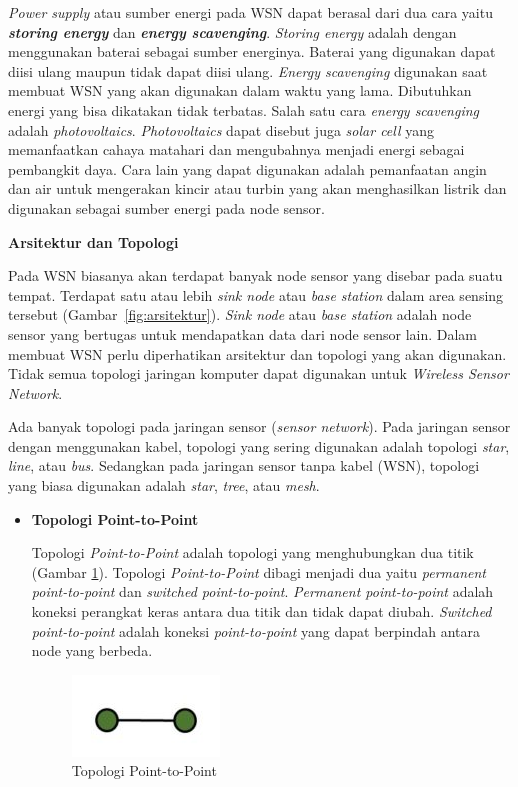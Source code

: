 \documentclass[a4paper,twoside]{article}
\begin{document}
\begin{enumerate}
\begin{itemize}
\textit{Power supply} atau sumber energi pada WSN dapat berasal dari dua cara yaitu \textbf{\textit{storing energy}} dan \textbf{\textit{energy scavenging}}. \textit{Storing energy} adalah dengan menggunakan baterai sebagai sumber energinya. Baterai yang digunakan dapat diisi ulang maupun tidak dapat diisi ulang. \textit{Energy scavenging} digunakan saat membuat WSN yang akan digunakan dalam waktu yang lama. Dibutuhkan energi yang bisa dikatakan tidak terbatas. Salah satu cara \textit{energy scavenging} adalah \textit{photovoltaics}. \textit{Photovoltaics} dapat disebut juga \textit{solar cell} yang memanfaatkan cahaya matahari dan mengubahnya menjadi energi sebagai pembangkit daya. Cara lain yang dapat digunakan adalah pemanfaatan angin dan air untuk mengerakan kincir atau turbin yang akan menghasilkan listrik dan digunakan sebagai sumber energi pada node sensor.
\end{itemize}
		
\textbf{Arsitektur dan Topologi}
		
		Pada WSN biasanya akan terdapat banyak node sensor yang disebar pada suatu tempat. Terdapat satu atau lebih \textit{sink node} atau \textit{base station} dalam area sensing tersebut (Gambar~\ref{fig:arsitektur}). \textit{Sink node} atau \textit{base station} adalah node sensor yang bertugas untuk mendapatkan data dari node sensor lain. Dalam membuat WSN perlu diperhatikan arsitektur dan topologi yang akan digunakan. Tidak semua topologi jaringan komputer dapat digunakan untuk \textit{Wireless Sensor Network}. 

Ada banyak topologi pada jaringan sensor (\textit{sensor network}). Pada jaringan sensor dengan menggunakan kabel, topologi yang sering digunakan adalah topologi \textit{star}, \textit{line}, atau \textit{bus}. Sedangkan pada jaringan sensor tanpa kabel (WSN), topologi yang biasa digunakan adalah \textit{star}, \textit{tree}, atau \textit{mesh}. 

\begin{itemize}
\item \textbf{Topologi Point-to-Point}

Topologi \textit{Point-to-Point} adalah topologi yang menghubungkan dua titik (Gambar \ref{fig:point2point}). Topologi \textit{Point-to-Point} dibagi menjadi dua yaitu \textit{permanent point-to-point} dan \textit{switched point-to-point}. \textit{Permanent point-to-point} adalah koneksi perangkat keras antara dua titik dan tidak dapat diubah. \textit{Switched point-to-point} adalah koneksi \textit{point-to-point} yang dapat berpindah antara node yang berbeda. 
\begin{figure} [H]
	\centering  
	\includegraphics[scale=0.6]{Gambar/point2point}  
	\caption[Topologi Point-to-Point]{Topologi Point-to-Point} 
	\label{fig:point2point} 
\end{figure}


\end{itemize}
\end{enumerate}
\end{document}
